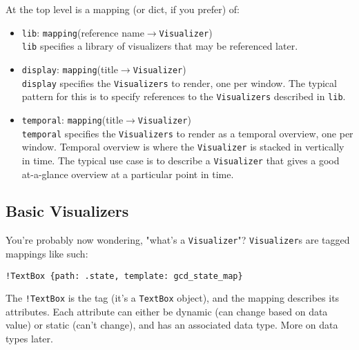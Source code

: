 \documentclass[11pt]{article}
\begin{document}
At the top level is a mapping (or dict, if you prefer) of:
\begin{itemize}
  \item \texttt{lib}: \texttt{mapping}(reference name$\rightarrow$\texttt{Visualizer}) \\
  \texttt{lib} specifies a library of visualizers that may be referenced later.

  \item \texttt{display}: \texttt{mapping}(title$\rightarrow$\texttt{Visualizer}) \\
  \texttt{display} specifies the \texttt{Visualizers} to render, one per window. The typical pattern for this is to specify references to the \texttt{Visualizers} described in \texttt{lib}.
  
  \item \texttt{temporal}: \texttt{mapping}(title$\rightarrow$\texttt{Visualizer}) \\
  \texttt{temporal} specifies the \texttt{Visualizers} to render as a temporal overview, one per window. Temporal overview is where the \texttt{Visualizer} is stacked in vertically in time. The typical use case is to describe a \texttt{Visualizer} that gives a good at-a-glance overview at a particular point in time.
\end{itemize}

\subsection{Basic Visualizers}
You're probably now wondering, "what's a \texttt{Visualizer}"? \texttt{Visualizer}s are tagged mappings like such:
\begin{verbatim}
!TextBox {path: .state, template: gcd_state_map}
\end{verbatim}
The \texttt{!TextBox} is the tag (it's a \texttt{TextBox} object), and the mapping describes its attributes. Each attribute can either be dynamic (can change based on data value) or static (can't change), and has an associated data type. More on data types later.
\end{document}
